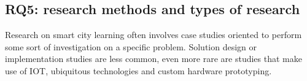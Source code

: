\subsection*{RQ5: research methods and types of research}
Research on smart city learning often involves case studies oriented to perform some sort of investigation on a specific problem. Solution design or implementation studies are less common, even more rare are studies that make use of IOT, ubiquitous technologies and custom hardware prototyping.